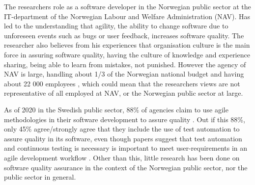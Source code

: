 
The researchers role as a software developer in the Norwegian public sector at the IT-department of the Norwegian Labour and Welfare Administration (NAV). Has led to the understanding that agility, the ability to change software due to unforeseen events such as bugs or user feedback, increases software quality. The researcher also believes from his experiences that organisation culture is the main force in assuring software quality, having the culture of knowledge and experience sharing, being able to learn from mistakes, not punished. However the agency of NAV is large, handling about 1/3 of the Norwegian national budget \cite{okp_nav_r_2022}\cite{bud_r_2021} and having about 22 000 employees \cite{org_nav_2023}, which could mean that the researchers views are not representative of all employed at NAV, or the Norwegian public sector at large.

As of 2020 in the Swedish public sector, 88\% of agencies claim to use agile methodologies in their software development to assure quality \cite{mb_2020}. Out if this 88\%, only 45\% agree/strongly agree that they include the use of test automation to assure quality in its software, even though papers suggest that test automation and continuous testing is necessary is important to meet user-requirements in an agile development workflow \cite{vk_2010}. Other than this, little research has been done on software quality assurance in the context of the Norwegian public sector, nor the public sector in general. 


